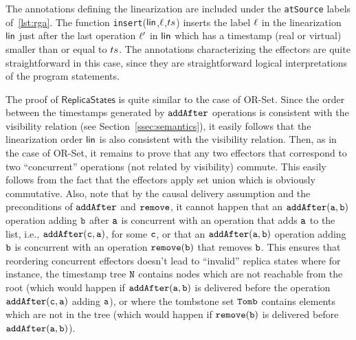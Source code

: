 The annotations defining the linearization are included under the \lstinline|atSource| labels of~\autoref{lst:rga}. The function {\tt insert}($\mathsf{lin}$,$\ell$,$ts$) inserts the label $\ell$ in the linearization $\mathsf{lin}$ just after the last operation $\ell'$ in $\mathsf{lin}$ which has a timestamp (real or virtual) smaller than or equal to $ts$. The annotations characterizing the effectors are quite straightforward in this case, since they are straightforward logical interpretations of the program statements.

The proof of $\mathsf{ReplicaStates}$ is quite similar to the case of OR-Set. Since the order between the timestamps generated by ${\tt addAfter}$ operations is consistent with the visibility relation (see Section~\ref{ssec:semantics}), it easily follows that the linearization order $\mathsf{lin}$ is also consistent with the visibility relation. Then, as in the case of OR-Set, it remains to prove that any two effectors that correspond to two ``concurrent'' operations (not related by visibility) commute. This easily follows from the fact that the effectors apply set union which is obviously commutative. Also, note that by the causal delivery assumption and the preconditions of ${\tt addAfter}$ and ${\tt remove}$, it cannot happen that an $\alabelshort[{\tt addAfter}]{a,b}$ operation adding ${\tt b}$ after ${\tt a}$ is concurrent with an operation that adds ${\tt a}$ to the list, i.e., $\alabelshort[{\tt addAfter}]{c,a}$, for some ${\tt c}$, or that an $\alabelshort[{\tt addAfter}]{a,b}$ operation adding ${\tt b}$ is concurrent with an operation $\alabelshort[{\tt remove}]{b}$ that removes ${\tt b}$. This ensures that reordering concurrent effectors doesn't lead to ``invalid'' replica states where for instance, the timestamp tree ${\tt N}$ contains nodes which are not reachable from the root (which would happen if $\alabelshort[{\tt addAfter}]{a,b}$ is delivered before the operation $\alabelshort[{\tt addAfter}]{c,a}$ adding ${\tt a}$), or where the tombstone set ${\tt Tomb}$ contains elements which are not in the tree (which would happen if $\alabelshort[{\tt remove}]{b}$ is delivered before $\alabelshort[{\tt addAfter}]{a,b}$).

